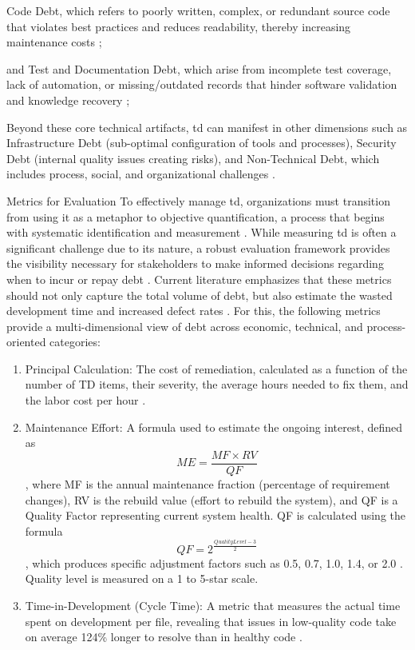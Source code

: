 \documentclass[12pt,reqno, twoside]{amsbook}
\makeatletter
\def\subsection{\@startsection{subsection}{2}%
      \z@{.5\linespacing\@plus.7\linespacing}{.25\linespacing}%
      {\normalfont\bfseries\flushleft}}
\theoremstyle{plain}
\numberwithin{equation}{chapter}
\numberwithin{section}{chapter}
\makeatother
\begin{document}
    Code Debt, which refers to poorly written, complex, or redundant source code that violates best practices and reduces 
    readability, thereby increasing maintenance costs \parencite{Farias2020};

    and Test and Documentation Debt, which arise from incomplete test coverage, lack of automation, or missing/outdated records that 
    hinder software validation and knowledge recovery \parencite{Li2020};

Beyond these core technical artifacts, \gls{td} can manifest in other dimensions such as Infrastructure Debt (sub-optimal configuration of 
tools and processes), Security Debt (internal quality issues creating risks), and Non-Technical Debt, which includes process, social, and 
organizational challenges \parencite{Vogel-Heuser2021}.

\subsection{Metrics for Evaluation}
To  effectively manage \gls{td}, organizations must transition from using it as a metaphor to objective quantification, a process 
that begins with systematic identification and measurement \parencite{Melo2022}. While measuring \gls{td} is often a significant 
challenge due to its nature, a robust evaluation framework provides the visibility necessary for stakeholders to make informed 
decisions regarding when to incur or repay debt \parencite{Melo2022,Tornhill2022}. Current literature emphasizes that these metrics
should not only capture the total volume of debt, but also estimate the wasted development time and increased defect rates 
\parencite{Melo2022}. For this, the following metrics provide a multi-dimensional view of debt across economic, technical, 
and process-oriented categories:
\begin{enumerate}
    \item Principal Calculation:
        The cost of remediation, calculated as a function of the number of TD items, their severity, the average hours needed 
        to fix them, and the labor cost per hour \parencite{Melo2022}.
    \item Maintenance Effort: 
        A formula used to estimate the ongoing interest, defined as \[ME=\frac{MF \times RV}{QF}\], where MF is the annual 
        maintenance fraction (percentage of requirement changes), RV is the rebuild value (effort to rebuild the system), and QF 
        is a Quality Factor representing current system health. QF is calculated using the formula \[QF = 2^{\frac{QualityLevel - 3}{2}}\], 
        which produces specific adjustment factors such as 0.5, 0.7, 1.0, 1.4, or 2.0 \parencite{Melo2022}. Quality level is 
        measured on a 1 to 5-star scale.
    \item Time-in-Development (Cycle Time): 
        A metric that measures the actual time spent on development per file, revealing that issues in low-quality code take on 
        average 124\% longer to resolve than in healthy code \parencite{Tornhill2022}.
\end{enumerate}
\end{document}
